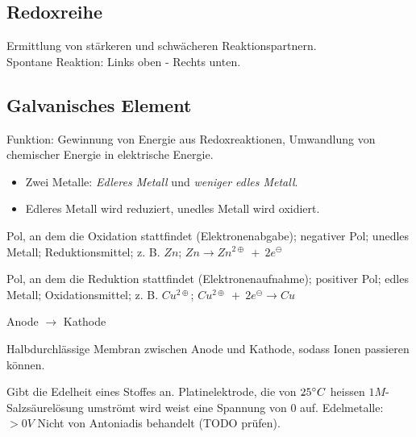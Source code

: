 \subsection{Redoxreihe}

Ermittlung von stärkeren und schwächeren Reaktionspartnern.\\

Spontane Reaktion: Links oben - Rechts unten.

\subsection{Galvanisches Element}

Funktion: Gewinnung von Energie aus Redoxreaktionen, Umwandlung von chemischer Energie in elektrische Energie.

\begin{itemize}
	\item Zwei Metalle: \textit{Edleres Metall} und \textit{weniger edles Metall}.
	\item Edleres Metall wird reduziert, unedles Metall wird oxidiert.
\end{itemize}

\begin{definition}[Anode]
	Pol, an dem die Oxidation stattfindet (Elektronenabgabe); negativer Pol; unedles Metall; Reduktionsmittel; z. B. $Zn$; $Zn \rightarrow Zn^{2\oplus}\ +\ 2e^\ominus$
\end{definition}

\begin{definition}[Kathode]
	Pol, an dem die Reduktion stattfindet (Elektronenaufnahme); positiver Pol; edles Metall; Oxidationsmittel; z. B. $Cu^{2\oplus}$; $Cu^{2\oplus}\ + \ 2e^\ominus \rightarrow Cu$
\end{definition}

\begin{definition}[Stromfluss]
	Anode $\rightarrow$ Kathode
\end{definition}

\begin{definition}[Membran]
	Halbdurchlässige Membran zwischen Anode und Kathode, sodass Ionen passieren können.
\end{definition}

\begin{definition}[Standardreduktionspotential]
	Gibt die Edelheit eines Stoffes an. Platinelektrode, die von $25\degree C$ heissen $1M$-Salzsäurelösung umströmt wird weist eine Spannung von $0$ auf.
	Edelmetalle: $>0V$ Nicht von Antoniadis behandelt (TODO prüfen).
\end{definition}


